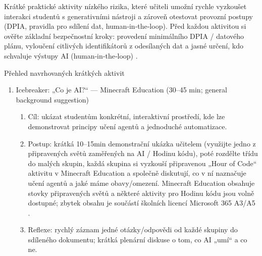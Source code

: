 Krátké praktické aktivity nízkého rizika, které učiteli umožní rychle vyzkoušet interakci studentů s generativními nástroji a zároveň otestovat provozní postupy (DPIA, pravidla pro sdílení dat, human‑in‑the‑loop). Před každou aktivitou si ověřte základní bezpečnostní kroky: provedení minimálního DPIA / datového plánu, vyloučení citlivých identifikátorů z odesílaných dat a jasné určení, kdo schvaluje výstupy AI (human‑in‑the‑loop) \cite{kb_malinka_chatgpt_ve_vyuce_dva_roky_pote_2024_pdf_90bc3aaf_page_12_1}. 

Přehled navrhovaných krátkých aktivit
\begin{enumerate}
  \item Icebreaker: „Co je AI?“ — Minecraft Education (30–45 min; general background suggestion)
    \begin{enumerate}
      \item Cíl: ukázat studentům konkrétní, interaktivní prostředí, kde lze demonstrovat principy učení agentů a jednoduché automatizace.
      \item Postup: krátká 10–15min demonstrační ukázka učitelem (využijte jedno z připravených světů zaměřených na AI / Hodinu kódu), poté rozdělte třídu do malých skupin, každá skupina si vyzkouší připravenou „Hour of Code“ aktivitu v Minecraft Education a společně diskutují, co v ní naznačuje učení agentů a jaké máme obavy/omezení. Minecraft Education obsahuje stovky připravených světů a některé aktivity pro Hodinu kódu jsou volně dostupné; zbytek obsahu je součástí školních licencí Microsoft 365 A3/A5 \cite{kb_ai_101_tipu_pdf_04e4a115_page_15_2}.
      \item Reflexe: rychlý záznam jedné otázky/odpovědi od každé skupiny do sdíleného dokumentu; krátká plenární diskuse o tom, co AI „umí“ a co ne.
    \end{enumerate}


\end{enumerate}
